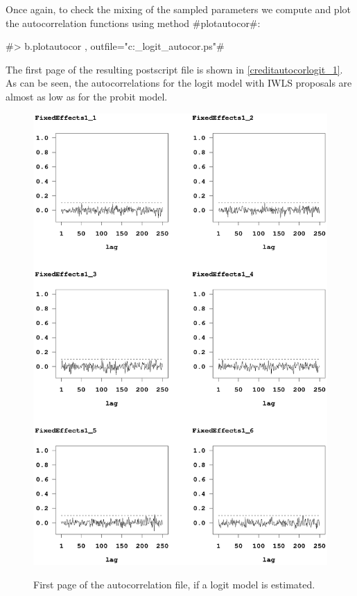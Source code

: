Once again, to check the mixing of the sampled parameters we
compute and plot the autocorrelation functions using method
#plotautocor#:

#> b.plotautocor , outfile="c:\results\credit_logit_autocor.ps"#

The first page of the resulting postscript file is shown in
\autoref{creditautocorlogit_1}. As can be seen, the
autocorrelations for the logit model with IWLS proposals are
almost as low as for the probit model.

\begin{figure}[ht]
\vspace{0.5cm}
\begin{center}
\includegraphics[scale=0.8]{grafiken/credit_logit_autocor1.ps}
\end{center}
{\em\caption{ \label{creditautocorlogit_1} First page of the
autocorrelation file, if a logit model is estimated.}}
\end{figure}


